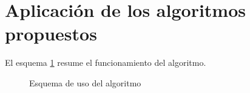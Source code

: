 \section{Aplicación de los algoritmos propuestos}
El esquema \ref{esq:PSO_DIR} resume el funcionamiento del algoritmo.
\begin{figure}[ht!]
\caption{Esquema de uso del algoritmo}

\label{esq:PSO_DIR}
\end{figure}
